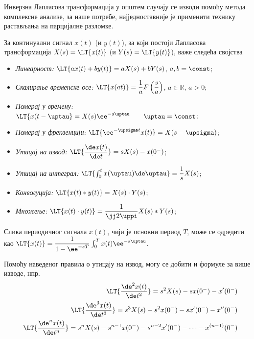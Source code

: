 Инверзна Лапласова трансформација у општем случају се изводи помоћу метода комплексне анализе, за наше потребе, најједноставније је 
применити технику растављања на парцијалне разломке.


За континуални сигнал $x(t)$ (и $y(t)$), за који постоји Лапласова трансформација
$X(s) = \LT{x(t)}$ (и $Y(s) = \LT{y(t)}$), важе следећа својства
\begin{itemize}\itemsep0pt
    \item \emph{Линеарност:} $\LT{ax(t) + by(t)} = a X(s) + b Y(s)$, \qquad $a,b = \const$;
    \item \emph{Скалирање временске осе:} $\LT{x(at)} = \dfrac{1}{a} F\left(\dfrac{s}{a}\right)$, \qquad $a \in \mathbb R$, $a > 0$;
    \item \emph{Померај у времену:} $\LT{x(t-\uptau} = X(s)\ee^{-s\uptau} \qquad \uptau = \const$; 
    \item \emph{Померај у фреквенцији:} $\LT{ \ee^{-\upsigma t} x(t) } = X(s - \upsigma)$; \\
    \item \emph{Утицај на извод:} $ \LT{ \dfrac{\de x(t)}{\de t} } = s X(s) - x(0^-) $;
    \item \emph{Утицај на интеграл:} $ \LT{ \int_0^t x(\uptau) \de \uptau } = \dfrac{1}{s} X(s)$;
    \item \emph{Конволуција: } $\LT{x(t) \ast y(t)} = X(s) \cdot Y(s)$; 
    \item \emph{Множење:} $\LT{ x(t) \cdot y(t) }  = \dfrac{1}{\jj2\uppi} X(s) \ast Y(s)$; 
\end{itemize}

Слика периодичног сигнала $x(t)$, чији је основни период $T$, може се одредити као 
$\LT{x(t)} = \dfrac{1}{1 - \ee^{-sT}} \int_0^T x(t) \ee^{-s\uptau}$.

Помоћу наведеног правила о утицају на извод, могу се добити и формуле за више изводе, нпр.
\begin{eqnarray}
    && \LT{ \dfrac{\de^2 x(t)}{\de t^2} } = s^2 X(s) - s x(0^-) - x'(0^-) \\
    && \LT{ \dfrac{\de^3 x(t)}{\de t^3} } = s^3 X(s) - s^2 x(0^-) - s x'(0^-) - x''(0^-) \\
    && \LT{ \dfrac{\de^n x(t)}{\de t^n} } = s^n X(s) - s^{n-1} x(0^-) - s^{n-2} x'(0^-) - \cdots - x^{(n-1)} (0^-) 
\end{eqnarray}


